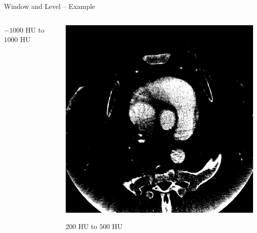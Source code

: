 \begin{frame}{Window and Level -- Example}
\begin{columns}[T, onlytextwidth]
\begin{column}{0.5\textwidth}
            $-1000$ HU to $1000$ HU
        \end{column}
        \begin{column}{0.5\textwidth}\centering
            \includegraphics[height=0.75\textheight]{img/200-500hu}

            $200$ HU to $500$ HU
        \end{column}
    \end{columns}
\end{frame}

